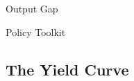 \documentclass[10pt]{article}
\begin{document}
    \begin{core}{Output Gap}




    \end{core}

    \begin{core}{Policy Toolkit}




    \end{core}

  \subsection{The Yield Curve}
\end{document}
